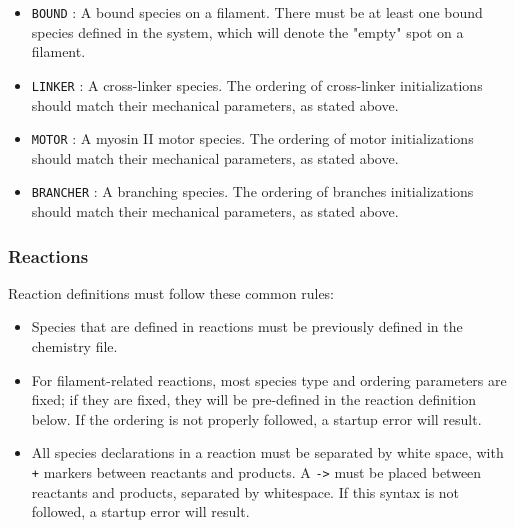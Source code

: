\documentclass[11pt, oneside]{article}   	%
\begin{document}
\begin{itemize}
\begin{itemize}
\item \texttt{BOUND} : A bound species on a filament. There must be at least one bound species defined in the system, which will denote the "empty" spot on a filament.
\item \texttt{LINKER} : A cross-linker species. The ordering of cross-linker initializations should match their mechanical parameters, as stated above.
\item \texttt{MOTOR} : A myosin II motor species. The ordering of motor initializations should match their mechanical parameters, as stated above.
\item \texttt{BRANCHER} : A branching species. The ordering of branches initializations should match their mechanical parameters, as stated above.
\end{itemize}
\end{itemize}

\subsubsection{Reactions}

Reaction definitions must follow these common rules:
\begin{itemize}
\item Species that are defined in reactions must be previously defined in the chemistry file. 
\item For filament-related reactions, most species type and ordering parameters are fixed; if they are fixed, they will be pre-defined in the reaction definition below. If the ordering is not properly followed, a startup error will result. 
\item All species declarations in a reaction must be separated by white space, with \texttt{+} markers between reactants and products. A \texttt{->} must be placed between reactants and products, separated by whitespace. If this syntax is not followed, a startup error will result.
\end{itemize}
\end{document}
